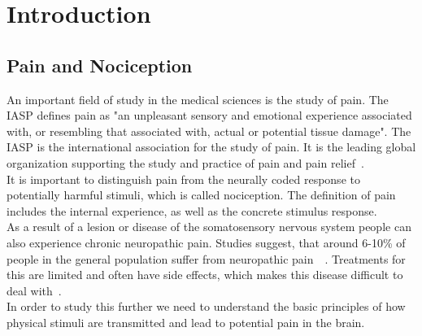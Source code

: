 \chapter{Introduction}
\begin{comment}
In this chapter I will give an introduction to the topic. I will give background information about neuropathic pain and the big picture goal of research in this field. \\
-quickly explain how the transmission of pain functions inside our bodies\\
-what is my bachelor thesis based on (paper from Roberto)\\
-contextualize thesis topic within the big picture \\
-talk quickly about openMNGlab and goal of adding analysis functionality and discuss software engineering goals for the framework\\

nociception/pain\\
neuropathic pain -> constant firing\\
measuring data -> microneurography\\
analyzing data -> openMNGlab\\
results -> ideas for problemsolving

C fibers
when these fibers fire all the time this is called neuropathic pain
\end{comment}
\section{Pain and Nociception}
An important field of study in the medical sciences is the study of pain. The IASP defines pain as "an unpleasant sensory and emotional experience associated with, or resembling that associated with, actual or potential tissue damage". The IASP is the international association for the study of pain. It is the leading global organization supporting the study and practice of pain and pain relief~\cite{iasp_2022}. \\
It is important to distinguish pain from the neurally coded response to potentially harmful stimuli, which is called nociception. The definition of pain includes the internal experience, as well as the concrete stimulus response.\\
As a result of a lesion or disease of the somatosensory nervous system people can also experience chronic neuropathic pain. Studies suggest, that around 6-10\% of people in the general population suffer from neuropathic pain~\cite{bouhassira_prevalence_2008}~\cite{van_hecke_neuropathic_2014}. Treatments for this are limited and often have side effects, which makes this disease difficult to deal with~\cite{brooks2017treatments}.\\
In order to study this further we need to understand the basic principles of how physical stimuli are transmitted and lead to potential pain in the brain.


